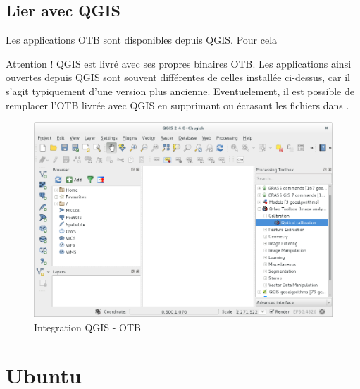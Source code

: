 \documentclass[10pt,a4paper]{article}
\begin{document}
\subsection{Lier avec QGIS}

Les applications OTB sont disponibles depuis QGIS. Pour cela

Attention ! QGIS est livré avec ses propres binaires OTB. Les applications ainsi
ouvertes depuis QGIS sont souvent différentes de celles installée ci-dessus, car
il s'agit typiquement d'une version plus ancienne.
Eventuelement, il est possible de remplacer l'OTB livrée avec QGIS en supprimant
ou écrasant les fichiers dans \texttt{}.

\begin{figure}[h]
  \center
  \includegraphics[width=1\textwidth]{Art/qgis-otb.png}
  \caption[]{Integration QGIS - OTB}
  \label{fig:otb-qgis}
\end{figure}

\clearpage
\section{Ubuntu}
\end{document}
